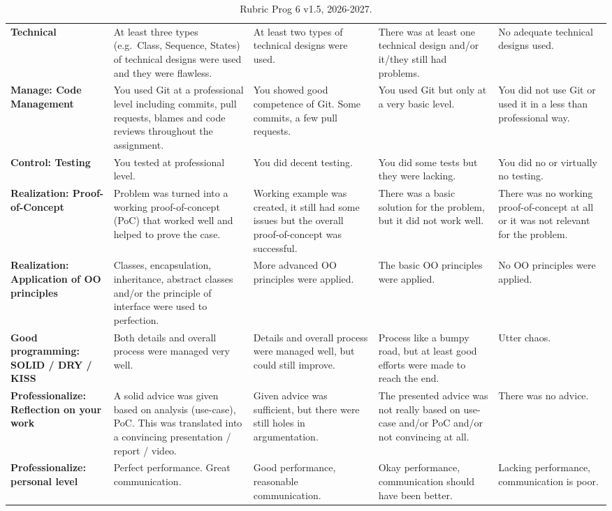 \documentclass[11pt,a4paper]{article}
\begin{document}
\begin{landscape}
\begin{table}[p]
\begin{tabularx}{\linewidth}{@{}>{\raggedright\arraybackslash}p{3.2cm} *{4}{>{\raggedright\arraybackslash}X}@{}}
\textbf{Technical} & At least three types (e.g.\ Class, Sequence, States) of technical designs were used and they were flawless. & At least two types of technical designs were used. & There was at least one technical design and/or it/they still had problems. & No adequate technical designs used. \\
\textbf{Manage: Code Management} & You used Git at a professional level including commits, pull requests, blames and code reviews throughout the assignment. & You showed good competence of Git. Some commits, a few pull requests. & You used Git but only at a very basic level. & You did not use Git or used it in a less than professional way. \\
\textbf{Control: Testing} & You tested at professional level. & You did decent testing. & You did some tests but they were lacking. & You did no or virtually no testing. \\
\textbf{Realization: Proof-of-Concept} & Problem was turned into a working proof-of-concept (PoC) that worked well and helped to prove the case. & Working example was created, it still had some issues but the overall proof-of-concept was successful. & There was a basic solution for the problem, but it did not work well. & There was no working proof-of-concept at all or it was not relevant for the problem. \\
\textbf{Realization: Application of OO principles} & Classes, encapsulation, inheritance, abstract classes and/or the principle of interface were used to perfection. & More advanced OO principles were applied. & The basic OO principles were applied. & No OO principles were applied. \\
\textbf{Good programming: SOLID / DRY / KISS} & Both details and overall process were managed very well. & Details and overall process were managed well, but could still improve. & Process like a bumpy road, but at least good efforts were made to reach the end. & Utter chaos. \\
\textbf{Professionalize: Reflection on your work} & A solid advice was given based on analysis (use-case), PoC. This was translated into a convincing presentation / report / video. & Given advice was sufficient, but there were still holes in argumentation. & The presented advice was not really based on use-case and/or PoC and/or not convincing at all. & There was no advice. \\
\textbf{Professionalize: personal level} & Perfect performance. Great communication. & Good performance, reasonable communication. & Okay performance, communication should have been better. & Lacking performance, communication is poor. \\
\bottomrule
\end{tabularx}
\caption{Rubric Prog 6 v1.5, 2026-2027.}
\label{tab:rubric}
\end{table}
\end{landscape}
\end{document}
